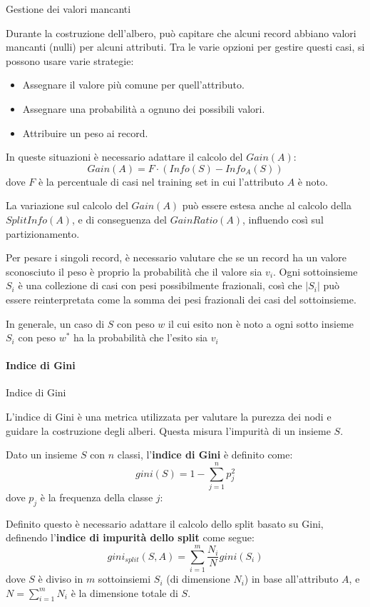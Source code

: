 \begin{nota}{Gestione dei valori mancanti}{}

Durante la costruzione dell'albero, può capitare che alcuni record
abbiano valori mancanti (nulli) per alcuni attributi.
Tra le varie opzioni per gestire questi casi, si possono usare varie strategie:
\begin{itemize}
    \item Assegnare il valore più comune per quell'attributo.
    \item Assegnare una probabilità a ognuno dei possibili valori.
    \item Attribuire un peso ai record.
\end{itemize}

In queste situazioni è necessario adattare il calcolo del $Gain(A)$:
\[
Gain(A) = F \cdot (Info(S) - Info_A(S))
\]
dove $F$ è la percentuale di casi nel training set in cui l'attributo $A$ è
noto.

La variazione sul calcolo del $Gain(A)$ può essere estesa anche al calcolo
della $SplitInfo(A)$, e di conseguenza del $GainRatio(A)$, influendo così
sul partizionamento.


Per pesare i singoli record, è necessario valutare che se un record ha un
valore sconosciuto il peso è proprio la probabilità che il valore sia $v_i$.
Ogni sottoinsieme $S_i$ è una collezione di casi con pesi possibilmente
frazionali, così che $|S_i|$ può essere reinterpretata come la somma dei
pesi frazionali dei casi del sottoinsieme.

In generale, un caso di $S$ con peso $w$ il cui esito non è noto a ogni
sotto insieme $S_i$ con peso $w^*$ ha la probabilità che l'esito sia $v_i$

\end{nota}


\paragraph{Indice di Gini}

\bigskip

\begin{definizione}{Indice di Gini}{}

L'indice di Gini è una metrica utilizzata per valutare la purezza dei nodi e
guidare la costruzione degli alberi.
Questa misura l'impurità di un insieme $S$.

Dato un insieme $S$ con $n$ classi, l'\textbf{indice di Gini} è definito come:
\[
gini(S) = 1 - \sum_{j=1}^{n}p_{j}^{2}
\]
dove $p_j$ è la frequenza della classe $j$:

Definito questo è necessario adattare il calcolo dello split basato su Gini,
definendo l'\textbf{indice di impurità dello split} come segue:
\[
gini_{split}(S, A) = \sum_{i=1}^{m}\frac{N_{i}}{N}gini(S_{i})
\]
dove $S$ è diviso in $m$ sottoinsiemi $S_i$ (di dimensione $N_i$) in base
all'attributo $A$, e $N = \sum_{i=1}^{m} N_i$ è la dimensione totale di $S$.

\end{definizione}


